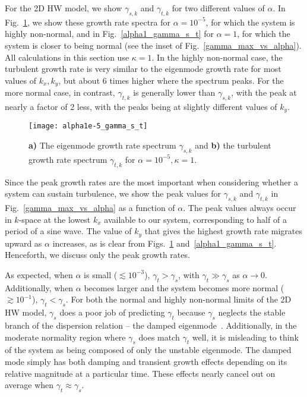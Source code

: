 \documentclass[twocolumn,showkeys,superscriptaddress]{revtex4}
\begin{document}
For the 2D HW model, we show
$\gamma_{s,k}$ and $\gamma_{t,k}$ for two different values of $\alpha$. In Fig.~\ref{alpha1e-5_gamma_s_t}, we show these growth rate spectra for $\alpha = 10^{-5}$, for which the system is
highly non-normal, and in Fig.~\ref{alpha1_gamma_s_t} for $\alpha = 1$, for which the system is closer to being normal (see the inset of Fig.~\ref{gamma_max_vs_alpha}). All calculations in this section use $\kappa=1$. 
In the highly non-normal case, the turbulent growth rate is very similar to the eigenmode growth rate for most values of $k_x,k_y$, but about 6 times higher where the spectrum peaks. For the more normal
case, in contrast, $\gamma_{t,k}$ is generally lower than $\gamma_{s,k}$, with the peak at nearly a factor of 2 less, with the peaks being at slightly different values of $k_y$.
\begin{figure}
\centerline{\texttt{[image: alpha1e-5\_gamma\_s\_t]}}
\caption{{\bf a)} The eigenmode growth rate spectrum $\gamma_{s,k}$ and {\bf b)} the turbulent growth rate spectrum $\gamma_{t,k}$ for $\alpha = 10^{-5}, \kappa=1$.}
\label{alpha1e-5_gamma_s_t}
\end{figure}

Since the peak growth rates are the most important when considering whether a system can sustain turbulence, we show the peak values for $\gamma_{s,k}$ and $\gamma_{t,k}$ in Fig.~\ref{gamma_max_vs_alpha} as a function of $\alpha$. 
The peak values always occur in $k$-space at the lowest $k_x$ available to our system, corresponding to half of a period of a sine wave. The value of $k_y$ that gives the highest growth rate migrates upward as $\alpha$ increases,
as is clear from Figs.~\ref{alpha1e-5_gamma_s_t} and~\ref{alpha1_gamma_s_t}. Henceforth, we discuss only the peak growth rates.

As expected, when $\alpha$ is small ($\lesssim 10^{-3}$), $\gamma_{t} > \gamma_{s}$, with
$\gamma_{t} \gg \gamma_{s}$ as $\alpha \to 0$. Additionally, when $\alpha$ becomes larger and the system becomes more normal ($\gtrsim 10^{-1}$), $\gamma_{t} < \gamma_{s}$.
For both the normal and highly non-normal limits of the 2D HW model, $\gamma_{s}$ does a poor job of predicting $\gamma_{t}$ because $\gamma_{s}$ neglects the stable branch of the
dispersion relation -- the damped eigenmode~\cite{makwana2011}. 
Additionally, in the moderate normality region where $\gamma_{s}$ does match $\gamma_{t}$ well, it is misleading to think of the system as being composed of only the
unstable eigenmode. The damped mode simply has both damping and transient growth effects depending on its relative magnitude at a particular time. These effects nearly cancel out on average when $\gamma_{t} \approx \gamma_{s}$.
\end{document}

